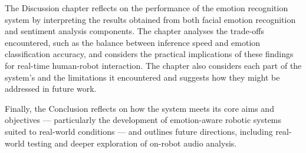 The Discussion chapter reflects on the performance of the emotion recognition system by interpreting the results obtained from both facial emotion recognition and sentiment analysis components. The chapter analyses the trade-offs encountered, such as the balance between inference speed and emotion classification accuracy, and considers the practical implications of these findings for real-time human-robot interaction. The chapter also considers each part of the system's and the limitations it encountered and suggests how they might be addressed in future work.

Finally, the Conclusion reflects on how the system meets its core aims and objectives — particularly the development of emotion-aware robotic systems suited to real-world conditions — and outlines future directions, including real-world testing and deeper exploration of on-robot audio analysis.